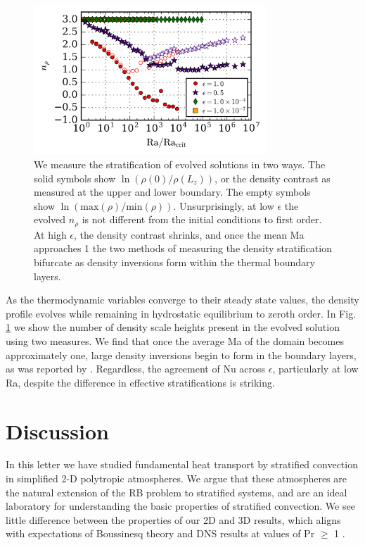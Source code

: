\documentclass[aps, prl, twocolumn, nofootinbib, groupedaddress, amsfonts, amssymb, amsmath]{revtex4-1}
\begin{document}
\begin{figure}[t]
\includegraphics[width=3.4375in]{./figs/density_v_ra.png}
\caption{\label{fig:nrho_v_ra} We measure the stratification of 
evolved solutions
in two ways.  The solid symbols show $\ln(\rho(0)/\rho(L_z))$, 
or the density contrast
as measured at the upper and lower boundary.  The empty symbols show 
$\ln(\text{max}(\rho)/\text{min}(\rho))$. 
Unsurprisingly, at low $\epsilon$ the evolved
$n_{\rho}$ is not different from the initial conditions to first order.  
At high $\epsilon$,
the density contrast shrinks, and once the mean 
Ma approaches 1 the two methods of
measuring the density stratification bifurcate as density 
inversions form within the thermal
boundary layers.}
\end{figure}

As the thermodynamic variables converge to their steady state values, 
the density profile evolves while remaining in hydrostatic equilibrium 
to zeroth order.  In Fig. \ref{fig:nrho_v_ra} we show the number of density 
scale heights present in the evolved solution using two measures.  
We find that once the average Ma of the domain
becomes approximately one, large density inversions begin to 
form in the boundary layers, as was reported by \cite{brandenburg&all2005}.  
Regardless, the agreement of Nu across $\epsilon$, particularly at
low Ra, despite the difference in effective stratifications is striking.  

\section{Discussion}
\label{sec:discussion}
In this letter we have studied fundamental heat transport by 
stratified convection in simplified 2-D polytropic atmospheres.
We argue that these atmospheres are the natural extension
of the RB problem to stratified systems, 
and are an ideal laboratory for understanding the basic 
properties of stratified convection. 
We see little difference between
the properties of our 2D and 3D results, which aligns with expectations
of Boussinesq theory and DNS results at values of Pr $\geq$ 1 \cite{ahlers&all2009}.
\end{document}
